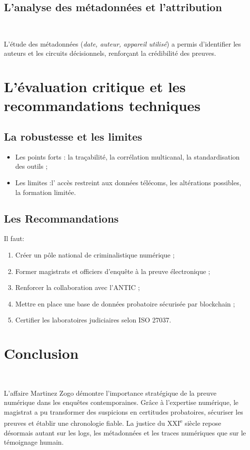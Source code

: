 \documentclass[12pt,a4paper]{report}
\begin{document}
\section{L'analyse des métadonnées et l'attribution}\

L’étude des métadonnées (\textit{date, auteur, appareil utilisé}) a permis d’identifier les auteurs et les circuits décisionnels, renforçant la crédibilité des preuves.

\chapter{L'évaluation critique et les recommandations techniques}

\section{La robustesse et les limites}

\begin{itemize}
    \item Les points forts : la traçabilité, la corrélation multicanal, la standardisation des outils ;
    \item Les limites :l' accès restreint aux données télécoms, les altérations possibles, la formation limitée.
\end{itemize}

\section{Les Recommandations}
Il faut:
\begin{enumerate}
    \item Créer un pôle national de criminalistique numérique ;
    \item Former magistrats et officiers d’enquête à la preuve électronique ;
    \item Renforcer la collaboration avec l’ANTIC ;
    \item Mettre en place une base de données probatoire sécurisée par blockchain ;
    \item Certifier les laboratoires judiciaires selon ISO 27037.
\end{enumerate}

\chapter*{Conclusion}
\

L’affaire Martinez Zogo démontre l’importance stratégique de la preuve numérique dans les enquêtes contemporaines.  
Grâce à l’expertise numérique, le magistrat a pu transformer des suspicions en certitudes probatoires, sécuriser les preuves et établir une chronologie fiable.  
La justice du XXI\textsuperscript{e} siècle repose désormais autant sur les logs, les métadonnées et les traces numériques que sur le témoignage humain.
\end{document}
